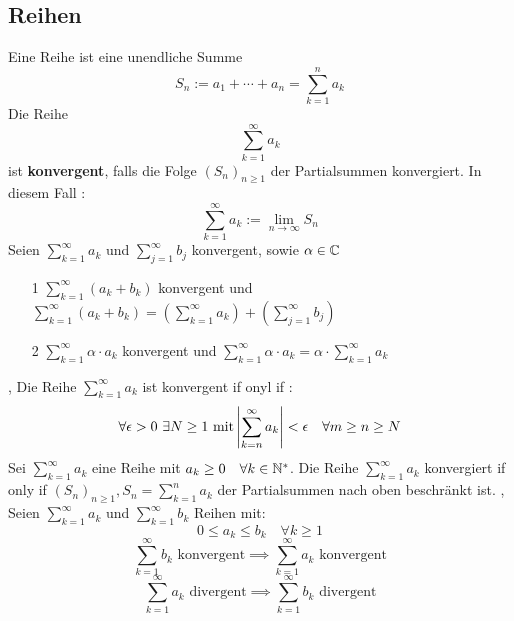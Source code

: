 \subsection{Reihen}
\Def[2.7.0] Eine Reihe ist eine unendliche Summe
\[S_{n} := a_{1}  + \cdots + a_{n} = \sum_{k=1}^{n} a_{k}\] \newline \newline \newline \newline \newline \newline \newline
\Def[2.37] Die Reihe \[\sum_{k=1}^{\infty} a_{k}\] ist \textbf{konvergent}, falls die Folge \((S_n)_{n \geq 1}\) der Partialsummen konvergiert. In diesem Fall : \[\sum_{k=1}^{\infty} a_{k} := \lim\limits_{n \rightarrow \infty} S_n\]
\Satz[2.40] Seien \(\sum_{k=1}^{\infty} a_{k}\) und \(\sum_{j=1}^{\infty} b_{j}\) konvergent, sowie \(\alpha \in \mathbb{C} \)
\begin{enumerate}
    \item [1] \(\sum_{k=1}^{\infty} (a_k + b_k)\) konvergent und \newline \(\sum_{k=1}^{\infty} (a_k + b_k) = (\sum_{k=1}^{\infty} a_{k}) + (\sum_{j=1}^{\infty} b_{j})\)
    \item [2] \(\sum_{k=1}^{\infty} \alpha \cdot a_k\) konvergent und \newline \(\sum_{k=1}^{\infty} \alpha \cdot a_k = \alpha \cdot \sum_{k=1}^{\infty}  a_k\)
\end{enumerate}
\sep
{}  \newline Die Reihe \(\sum_{k=1}^{\infty} a_k \) ist konvergent if onyl if :
\[ \forall \epsilon > 0 \ \exists N \geq 1 \ \text{mit} \left\lvert \sum_{k=n}^{\infty} a_k \right\rvert < \epsilon \quad \forall m \geq n \geq N\]
\Satz[2.42] Sei \(\sum_{k=1}^{\infty} a_{k}\) eine Reihe mit \newline \(a_k \geq 0 \quad \forall k \in \mathbb{N}^*\). Die Reihe \(\sum_{k=1}^{\infty} a_{k}\) konvergiert if only if \((S_n)_{n \geq 1}, S_n = \sum_{k=1}^{n} a_{k}\) der Partialsummen nach oben beschränkt ist. \newline
\sep
{} \newline Seien $\sum_{k=1}^{\infty} a_{k}$ und $\sum_{k=1}^{\infty} b_{k}$ Reihen mit: \[0 \leq a_{k} \leq b_{k} \quad \forall k \geq 1\]
\[ \sum_{k=1}^{\infty} b_{k} \text{ konvergent} \implies \sum_{k=1}^{\infty} a_{k} \text{ konvergent} \]
\[ \sum_{k=1}^{\infty} a_{k} \text{ divergent} \implies \sum_{k=1}^{\infty} b_{k} \text{ divergent} \]

